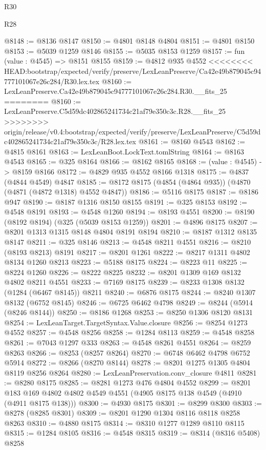 \begin{lexlean}{R30}
\begin{lexlean}{R28}
\begin{coremodule}
{{{{{{{{{{{{{{{{{{{{{{{{{{{{{{{{{{{{{{{{{{{{{{{{{{{{{{{{{{{{{{{{{{{{{{{{{{{{{{{{{{{{{{{{{{{{{{{{{{{{{{{{{{{{{{{{{{{{{{{{{{{{{{{{{{{{{{{{{{{{{{{@8148 := @8136 @8147
@8150 := @4801 @8148 @4804
@8151 := @4801 @8150
@8153 := @5039 @1259 @8146
@8155 := @5035 @8153 @1259
@8157 := fun (value : @4545) => @8151 @8155
@8159 := @4812 @935 @4552
<<<<<<<< HEAD:bootstrap/expected/verify/preserve/LexLeanPreserve/Ca42e49b879045c94777101067e26c284/R30.lex.tex
@8160 := LexLeanPreserve.Ca42e49b879045c94777101067e26c284.R30.__fits_25
========
@8160 := LexLeanPreserve.C5d59dc402865241734c21af79e350c3c.R28.__fits_25
>>>>>>>> origin/release/v0.4:bootstrap/expected/verify/preserve/LexLeanPreserve/C5d59dc402865241734c21af79e350c3c/R28.lex.tex
@8161 := @8160 @4543
@8162 := @4815 @8161
@8163 := LexLeanBoot.LockText.tomlString
@8164 := @8163 @4543
@8165 := @325 @8164
@8166 := @8162 @8165
@8168 := (value : @4545) -> @8159 @8166
@8172 := @4829 @935 @4552 @8166 @1318
@8175 := @4837 (@4844 @4549) @4847
@8185 := @8172 @8175 (@4854 (@4864 @935)) (@4870 (@4871 (@4872 @1318) @4552 @4847))
@8186 := @5116 @8175
@8187 := @8186 @947
@8190 := @8187 @1316 @8150 @8155
@8191 := @325 @8153
@8192 := @4548 @8191
@8193 := @4548 @1260
@8194 := @8193 @4551
@8200 := @8190 (@8192 @8194) (@325 (@5039 @8153 @1259))
@8201 := @4896 @8175
@8207 := @8201 @1313 @1315 @8148 @4804 @8191 @8194
@8210 := @8187 @1312 @8135 @8147
@8211 := @325 @8146
@8213 := @4548 @8211 @4551
@8216 := @8210 (@8193 @8213) @8191
@8217 := @8201 @1261
@8222 := @8217 @1311 @4802 @8134 @1260 @8213
@8223 := @5188 @8175
@8224 := @8223 @11
@8225 := @8224 @1260
@8226 := @8222 @8225
@8232 := @8201 @1309 @169 @8132 @4802 @8211 @4551
@8233 := @7169 @8175
@8239 := @8233 @1308 @8132 (@1284 (@6467 @8145)) @8211
@8240 := @6876 @8175
@8244 := @8240 @1307 @8132 (@6752 @8145)
@8246 := @6725 @6462 @4798
@8249 := @8244 (@5914 (@8246 @8144))
@8250 := @8186 @1268
@8253 := @8250 @1306 @8120 @8131
@8254 := LexLeanTarget.TargetSyntax.Value.closure
@8256 := @8254 @1273 @4552
@8257 := @4548 @8256
@8258 := @1284 @8113
@8259 := @4548 @8258
@8261 := @7043 @1297 @333
@8263 := @4548 @8261 @4551
@8264 := @8259 @8263
@8266 := @8253 (@8257 @8264)
@8270 := @6748 @6462 @4798 @6752 @5914
@8272 := @8266 (@8270 @8144)
@8278 := @8201 @1275 @1305 @4804 @8119 @8256 @8264
@8280 := LexLeanPreservation.conv_closure @4811
@8281 := @8280 @8175
@8285 := @8281 @1273 @476 @4804 @4552
@8299 := @8201 @183 @169 @4802 @4802 @4549 @4551 (@4905 @8175 @138 @4549 (@4910 (@4911 @8175 @138)))
@8300 := @4930 @8175
@8301 := @8299 @8300
@8303 := @8278 (@8285 @8301)
@8309 := @8201 @1290 @1304 @8116 @8118 @8258 @8263
@8310 := @4880 @8175
@8314 := @8310 @1277 @1289 @8110 @8115
@8315 := @1284 @8105
@8316 := @4548 @8315
@8319 := @8314 (@8316 @5408) @8258
}}}}}}}}}}}}}}}}}}}}}}}}}}}}}}}}}}}}}}}}}}}}}}}}}}}}}}}}}}}}}}}}}}}}}}}}}}}}}}}}}}}}}}}}}}}}}}}}}}}}}}}}}}}}}}}}}}}}}}}}}}}}}}}}}}}}}}}}}}}}}}}
\end{coremodule}
\end{lexlean}
\end{lexlean}
